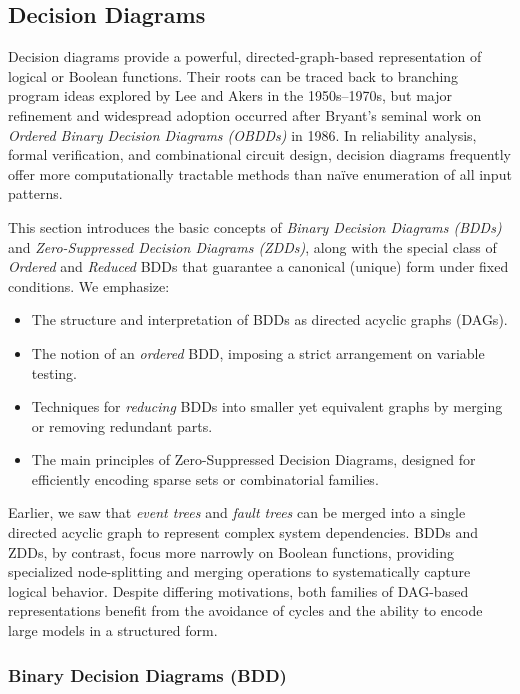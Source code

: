 \subsection{Decision Diagrams}
\label{sec:decision_diagrams}

Decision diagrams provide a powerful, directed-graph-based representation of logical or Boolean functions. Their roots can be traced back to branching program ideas explored by Lee and Akers in the 1950s–1970s, but major refinement and widespread adoption occurred after Bryant's seminal work on \emph{Ordered Binary Decision Diagrams (OBDDs)} in 1986. In reliability analysis, formal verification, and combinational circuit design, decision diagrams frequently offer more computationally tractable methods than naïve enumeration of all input patterns.

This section introduces the basic concepts of \emph{Binary Decision Diagrams (BDDs)} and \emph{Zero-Suppressed Decision Diagrams (ZDDs)}, along with the special class of \emph{Ordered} and \emph{Reduced} BDDs that guarantee a canonical (unique) form under fixed conditions. We emphasize:
\begin{itemize}
\item The structure and interpretation of BDDs as directed acyclic graphs (DAGs).
\item The notion of an \emph{ordered} BDD, imposing a strict arrangement on variable testing.
\item Techniques for \emph{reducing} BDDs into smaller yet equivalent graphs by merging or removing redundant parts.
\item The main principles of Zero-Suppressed Decision Diagrams, designed for efficiently encoding sparse sets or combinatorial families.
\end{itemize}

Earlier, we saw that \emph{event trees} and \emph{fault trees} can be merged into a single directed acyclic graph to represent complex system dependencies. BDDs and ZDDs, by contrast, focus more narrowly on Boolean functions, providing specialized node-splitting and merging operations to systematically capture logical behavior. Despite differing motivations, both families of DAG-based representations benefit from the avoidance of cycles and the ability to encode large models in a structured form.

\subsubsection{Binary Decision Diagrams (BDD)}
\label{sec:bdd}

